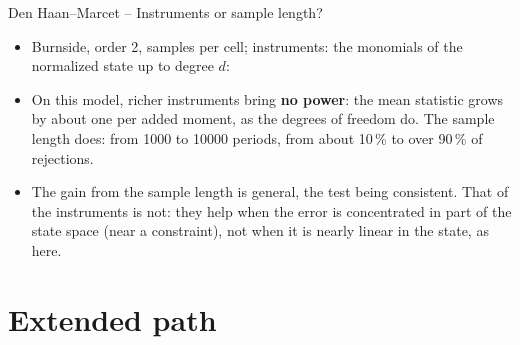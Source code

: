 \documentclass[11pt,aspectratio=169]{beamer}
\begin{document}
\begin{frame}{Den Haan--Marcet -- Instruments or sample length?}

\begin{itemize}

\item Burnside, order 2, \dhmInstrumentsReplic{} samples per cell; instruments: the monomials of the normalized state up to degree $d$:
\begin{center}
\small

\end{center}

\item On this model, richer instruments bring \textbf{no power}: the mean statistic grows by about one per added moment, as the degrees of freedom do. The sample length does: from 1000 to 10000 periods, from about 10\,\% to over 90\,\% of rejections.\newline

\item The gain from the sample length is general, the test being consistent. That of the instruments is not: they help when the error is concentrated in part of the state space (near a constraint), not when it is nearly linear in the state, as here.

\end{itemize}

\end{frame}

\section{Extended path}
\end{document}

